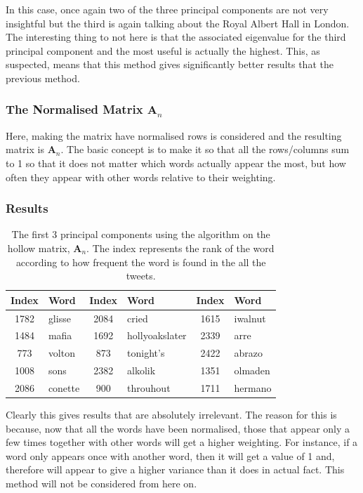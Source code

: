 \documentclass[11pt,a4paper]{article}
\begin{document}
In this case, once again two of the three principal components are not very insightful but the third is again talking about the Royal Albert Hall in London. The interesting thing to not here is that the associated eigenvalue for the third principal component and the most useful is actually the highest. This, as suspected, means that this method gives significantly better results that the previous method.

\subsubsection{The Normalised Matrix $\mathbf{A}_{n}$}
Here, making the matrix have normalised rows is considered and the resulting matrix is $\mathbf{A}_n$. The basic concept is to make it so that all the rows/columns sum to 1 so that it does not matter which words actually appear the most, but how often they appear with other words relative to their weighting.

\subsubsection*{Results}

\begin{table}[H]
\center
\begin{tabular}{| c l | c l | c l |}
\hline
Index & Word & Index & Word & Index & Word\\
\hline
1782 & glisse & 2084 & cried & 1615 & iwalnut\\
1484 & mafia & 1692 & hollyoakslater & 2339 & arre\\
773 & volton & 873 & tonight's &2422 & abrazo\\
1008 & sons & 2382 & alkolik & 1351 & olmaden\\
2086 & conette & 900 & throuhout & 1711 & hermano\\
\hline
\end{tabular}
\caption{The first 3 principal components using the algorithm on the hollow matrix, $ \mathbf{A}_n$. The index represents the rank of the word according to how frequent the word is found in the all the tweets. }
\end{table}

Clearly this gives results that are absolutely irrelevant. The reason for this is because, now that all the words have been normalised, those that appear only a few times together with other words will get a higher weighting. For instance, if a word only appears once with another word, then it will get a value of 1 and, therefore will appear to give a higher variance than it does in actual fact. This method will not be considered from here on.
\end{document}
